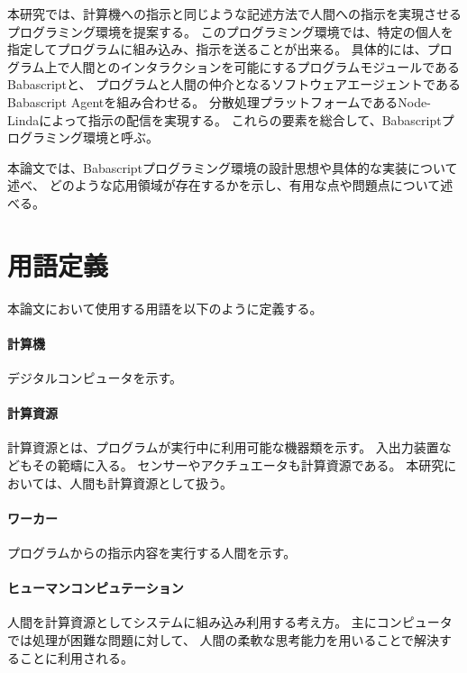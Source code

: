 本研究では、計算機への指示と同じような記述方法で人間への指示を実現させるプログラミング環境を提案する。
このプログラミング環境では、特定の個人を指定してプログラムに組み込み、指示を送ることが出来る。
具体的には、プログラム上で人間とのインタラクションを可能にするプログラムモジュールであるBabascriptと、
プログラムと人間の仲介となるソフトウェアエージェントであるBabascript
Agentを組み合わせる。
分散処理プラットフォームであるNode-Lindaによって指示の配信を実現する。
これらの要素を総合して、Babascriptプログラミング環境と呼ぶ。

本論文では、Babascriptプログラミング環境の設計思想や具体的な実装について述べ、
どのような応用領域が存在するかを示し、有用な点や問題点について述べる。

\section{用語定義}\label{ux7528ux8a9eux5b9aux7fa9}

本論文において使用する用語を以下のように定義する。

\paragraph{計算機}\label{ux8a08ux7b97ux6a5f}

デジタルコンピュータを示す。

\paragraph{計算資源}\label{ux8a08ux7b97ux8cc7ux6e90}

計算資源とは、プログラムが実行中に利用可能な機器類を示す。
入出力装置などもその範疇に入る。
センサーやアクチュエータも計算資源である。
本研究においては、人間も計算資源として扱う。

\paragraph{ワーカー}\label{ux30efux30fcux30abux30fc}

プログラムからの指示内容を実行する人間を示す。

\paragraph{ヒューマンコンピュテーション}\label{ux30d2ux30e5ux30fcux30deux30f3ux30b3ux30f3ux30d4ux30e5ux30c6ux30fcux30b7ux30e7ux30f3}

人間を計算資源としてシステムに組み込み利用する考え方。
主にコンピュータでは処理が困難な問題に対して、
人間の柔軟な思考能力を用いることで解決することに利用される。

